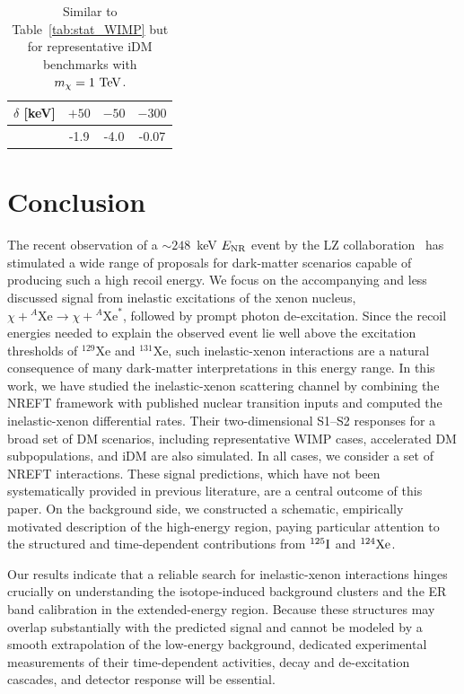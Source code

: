 \documentclass[11pt,a4paper]{article}
\newcommand{\Xe}{\mathrm{Xe}}
\begin{document}
\begin{table}[t]
\centering
\begin{tabular}{cccc}
\hline
$\delta$ [keV] & $+50$ & $-50$ & $-300$  \\
\hline
  & -1.9  & -4.0 &  -0.07 \\
\hline
\end{tabular}
\caption{Similar to Table~\ref{tab:stat_WIMP} but for representative iDM benchmarks with $m_\chi=1~{\rm TeV}$.}
\label{tab:idm_likelihood}
\end{table}




\section{Conclusion}
\label{sec:conclusion}
The recent observation of a $\sim 248$~keV $E_{\rm NR}$ event by the LZ collaboration~\cite{LZ2026} has stimulated a wide range of proposals for dark-matter scenarios capable of producing such a high recoil energy. We focus on the accompanying and less discussed signal from inelastic excitations of the xenon nucleus, $\chi+{}^{A}\Xe\rightarrow\chi+{}^{A}\Xe^{*}$, followed by prompt photon de-excitation. Since the recoil energies needed to explain the observed event lie well above the excitation thresholds of $^{129}\Xe$ and $^{131}\Xe$, such inelastic-xenon interactions are a natural consequence of many dark-matter interpretations in this energy range. In this work, we have studied the inelastic-xenon scattering channel by combining the NREFT framework with published nuclear transition inputs and computed the inelastic-xenon differential rates. Their two-dimensional S1--S2 responses for a broad set of DM scenarios, including representative WIMP cases, accelerated DM subpopulations, and iDM are also simulated. In all cases, we consider a set of NREFT interactions. These signal predictions, which have not been systematically provided in previous literature, are a central outcome of this paper. On the background side, we constructed a schematic, empirically motivated description of the high-energy region, paying particular attention to the structured and time-dependent contributions from $^{125}{\rm I}$ and $^{124}{\rm Xe}$.

Our results indicate that a reliable search for inelastic-xenon interactions hinges crucially on understanding the isotope-induced background clusters and the ER band calibration in the extended-energy region. Because these structures may overlap substantially with the predicted signal and cannot be modeled by a smooth extrapolation of the low-energy background, dedicated experimental measurements of their time-dependent activities, decay and de-excitation cascades, and detector response will be essential. 
\end{document}
